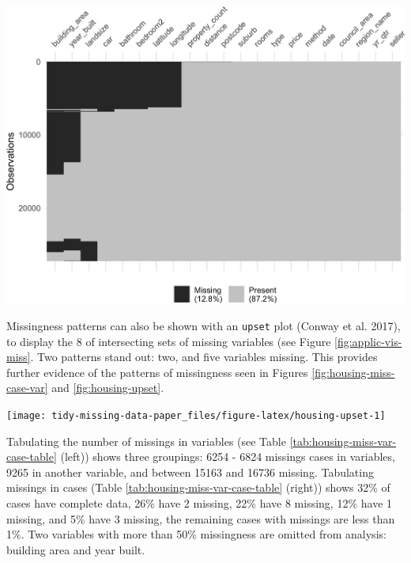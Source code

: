 \documentclass[]{article}
\let\origfigure\figure
\let\endorigfigure\endfigure
\renewenvironment{figure}[1][2] {
    \expandafter\origfigure\expandafter[H]
} {
    \endorigfigure
}
\theoremstyle{definition}
\theoremstyle{definition}
\theoremstyle{definition}
\theoremstyle{remark}
\begin{document}
\begin{figure}

{\centering \includegraphics[width=0.85\linewidth]{tidy-missing-data-paper_files/figure-latex/applic-vis-miss-1} 

}

\caption{Heatmap of clustered missingness for the housing data. Three groups of missingness are apparent, at the top for building area to longitude, the middle for building area and year built, at the end for building area, year built, and landsize. There is some structure in the missings.}\label{fig:applic-vis-miss}
\end{figure}

Missingness patterns can also be shown with an \texttt{upset} plot
(Conway et al. 2017), to display the 8 of intersecting sets of missing
variables (see Figure \ref{fig:applic-vis-miss}. Two patterns stand out:
two, and five variables missing. This provides further evidence of the
patterns of missingness seen in Figures \ref{fig:housing-miss-case-var}
and \ref{fig:housing-upset}.

\begin{figure}

{\centering \texttt{[image: tidy-missing-data-paper\_files/figure-latex/housing-upset-1]} 

}

\caption{An upset plot of eight sets of missingness in the housing data. Two missingness patterns are clear, year built and building area, and lattitude through to building area.}\label{fig:housing-upset}
\end{figure}

Tabulating the number of missings in variables (see Table
\ref{tab:housing-miss-var-case-table} (left)) shows three groupings:
6254 - 6824 missings cases in variables, 9265 in another variable, and
between 15163 and 16736 missing. Tabulating missings in cases (Table
\ref{tab:housing-miss-var-case-table} (right)) shows 32\% of cases have
complete data, 26\% have 2 missing, 22\% have 8 missing, 12\% have 1
missing, and 5\% have 3 missing, the remaining cases with missings are
less than 1\%. Two variables with more than 50\% missingness are omitted
from analysis: building area and year built.
\end{document}
